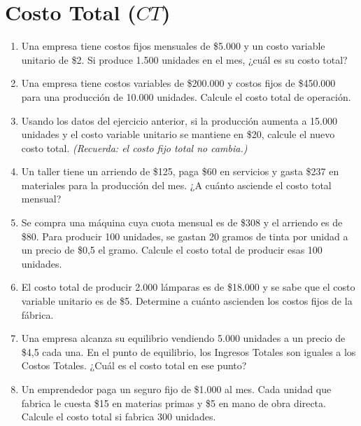 \documentclass[12pt,a4paper]{article}
\newcommand{\answerspace}{\vspace{4.5cm}}
\begin{document}
\newpage

\section{Costo Total ($CT$)}

\begin{enumerate}[label=\textbf{\arabic*.}, leftmargin=*, itemsep=0pt]

\item Una empresa tiene costos fijos mensuales de \$5.000 y un costo variable unitario de \$2. Si produce 1.500 unidades en el mes, ¿cuál es su costo total?
\answerspace

\item Una empresa tiene costos variables de \$200.000 y costos fijos de \$450.000 para una producción de 10.000 unidades. Calcule el costo total de operación.
\answerspace

\item Usando los datos del ejercicio anterior, si la producción aumenta a 15.000 unidades y el costo variable unitario se mantiene en \$20, calcule el nuevo costo total. \textit{(Recuerda: el costo fijo total no cambia.)}
\answerspace

\item Un taller tiene un arriendo de \$125, paga \$60 en servicios y gasta \$237 en materiales para la producción del mes. ¿A cuánto asciende el costo total mensual?
\answerspace

\item Se compra una máquina cuya cuota mensual es de \$308 y el arriendo es de \$80. Para producir 100 unidades, se gastan 20 gramos de tinta por unidad a un precio de \$0,5 el gramo. Calcule el costo total de producir esas 100 unidades.
\answerspace

\item El costo total de producir 2.000 lámparas es de \$18.000 y se sabe que el costo variable unitario es de \$5. Determine a cuánto ascienden los costos fijos de la fábrica.
\answerspace

\item Una empresa alcanza su equilibrio vendiendo 5.000 unidades a un precio de \$4,5 cada una. En el punto de equilibrio, los Ingresos Totales son iguales a los Costos Totales. ¿Cuál es el costo total en ese punto?
\answerspace

\item Un emprendedor paga un seguro fijo de \$1.000 al mes. Cada unidad que fabrica le cuesta \$15 en materias primas y \$5 en mano de obra directa. Calcule el costo total si fabrica 300 unidades.
\answerspace


\end{enumerate}
\end{document}
